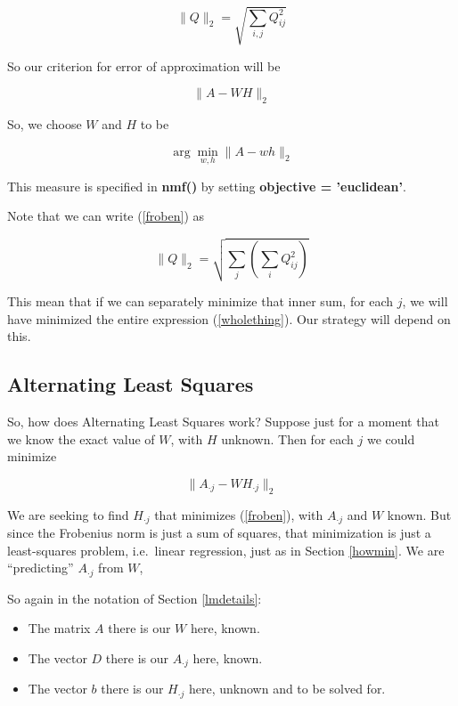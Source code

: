 \begin{equation}
\label{froben}
\|Q\|_2 = 
\sqrt{
\sum_{i,j} Q_{ij}^2
}
\end{equation}

So our criterion for error of approximation will be

\begin{equation}
\label{errawh}
\|A - WH\|_2
\end{equation}

So, we choose $W$ and $H$ to be 

\begin{equation}
\arg \min_{w,h} \|A - wh\|_2
\end{equation}

This measure is specified in {\bf nmf()} by setting {\bf objective =
'euclidean'}.

Note that we can write (\ref{froben}) as

\begin{equation}
\label{wholething}
\|Q\|_2 = 
\sqrt{
\sum_j \left ( \sum_i Q_{ij}^2 \right )
}
\end{equation}

This mean that if we can separately minimize that inner sum, for each
$j$, we will have minimized the entire expression (\ref{wholething}).
Our strategy will depend on this.

\subsection{Alternating Least Squares}

So, how does Alternating Least Squares work?  Suppose just for a moment
that we know the exact value of $W$, with $H$ unknown.  Then for each
$j$ we could minimize

\begin{equation}
\label{errajwhj}
\|A_{\cdot j} - W H_{\cdot j}\|_2
\end{equation}

We are seeking to find $H_{\cdot j}$ that minimizes (\ref{froben}), with
$A_{\cdot j}$ and $W$ known.  But since the Frobenius norm is just a sum
of squares, that minimization is just a least-squares problem, i.e.\
linear regression, just as in Section \ref{howmin}.  We are
``predicting'' $A_{\cdot j}$ from $W$,

So again in the notation of Section \ref{lmdetails}:

\begin{itemize}

\item The matrix $A$ there is our $W$ here, known.

\item The vector $D$ there is our $A_{\cdot j}$ here, known.

\item The vector $b$ there is our $H_{\cdot j}$ here, unknown and to be
solved for.

\end{itemize} 

